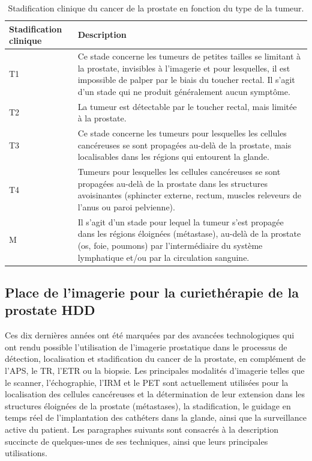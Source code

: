 \begin {table}[ht]
\caption{Stadification clinique du cancer de la prostate en fonction du type de la tumeur.}
\label{StadificationProsatate} 
\renewcommand{\arraystretch}{1.4}
	\begin{tabular}{p{5.5cm} p{9.0cm}}
		\toprule[1.3pt]
        \hline
        Stadification clinique                   &      Description   \\ 
        \hline
        T1               			   & Ce stade concerne les tumeurs de petites tailles se limitant à la prostate, invisibles à l'imagerie et pour lesquelles, il est impossible de palper par le biais du toucher rectal. Il s’agit d’un stade qui ne produit généralement aucun symptôme.                                  \\ 
        T2               			   & La tumeur est détectable par le toucher rectal, mais limitée à la prostate.                               \\ 
        T3               			   & Ce stade concerne les tumeurs pour lesquelles les cellules cancéreuses se sont propagées au-delà de la prostate, mais localisables dans les régions qui entourent la glande.                                \\
        T4               			   & Tumeurs pour lesquelles les cellules cancéreuses se sont propagées au-delà de la prostate dans les structures avoisinantes (sphincter externe, rectum, muscles releveurs de l’anus ou paroi pelvienne).                                \\ 
        M               			   & Il s’agit d’un stade pour lequel la tumeur s’est propagée dans les régions éloignées (métastase), au-delà de la prostate (os, foie, poumons) par l’intermédiaire du système lymphatique et/ou par la circulation sanguine.                                 \\ 
        \bottomrule[1.3pt]
	\end{tabular} 
\end {table}
%
\subsection{Place de l'imagerie pour la curiethérapie de la prostate HDD}
Ces dix dernières années ont été marquées par des avancées technologiques qui ont rendu possible l’utilisation de l’imagerie prostatique dans le processus de détection, localisation et stadification du cancer de la prostate, en complément de l’APS, le TR, l’ETR ou la biopsie. Les principales modalités d’imagerie telles que le scanner, l’échographie, l’IRM et le PET sont actuellement utilisées pour la localisation des cellules cancéreuses et la détermination de leur extension dans les structures éloignées de la prostate (métastases), la stadification, le guidage en temps réel de l’implantation des cathéters dans la glande, ainsi que la surveillance active du patient. Les paragraphes suivants sont consacrés à la description succincte de quelques-unes de ses techniques, ainsi que leurs principales utilisations.
%
